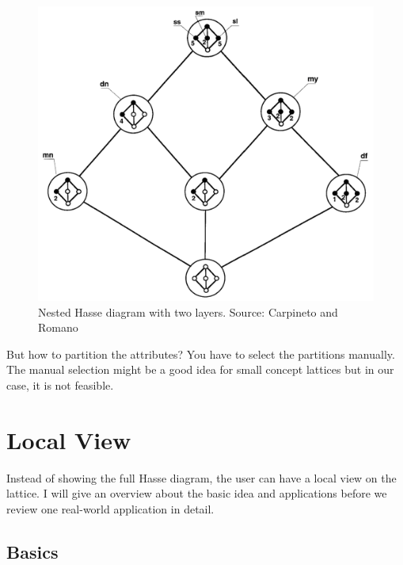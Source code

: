 \documentclass[11pt]{report}
\begin{document}
\begin{figure}[!ht]
	\centering
	\includegraphics[width=\linewidth]{./images/nested}
\caption{Nested Hasse diagram with two layers. Source: Carpineto and Romano \cite{carpineto2004concept}}
\label{figure:nested}
\end{figure}
	
But how to partition the attributes? You have to select the partitions manually. The manual selection might be a good idea for small concept lattices but in our case, it is not feasible.

\section{Local View}
\label{Local View}

Instead of showing the full Hasse diagram, the user can have a local view on the lattice. I will give an overview about the basic idea and applications before we review one real-world application in detail.

\subsection{Basics}
\end{document}
